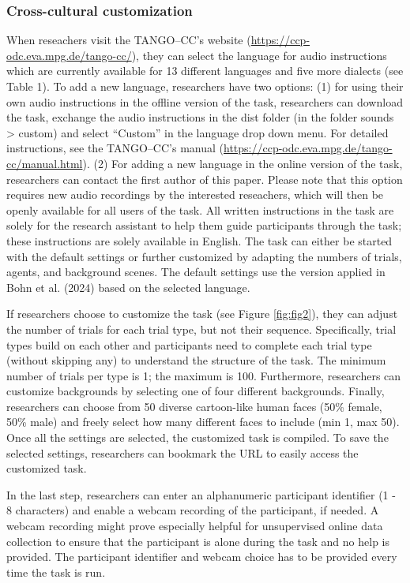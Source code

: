 \documentclass[
  man,floatsintext]{apa7}
\begin{document}
\subsubsection{Cross-cultural customization}\label{cross-cultural-customization}

When reseachers visit the TANGO--CC's website
(\url{https://ccp-odc.eva.mpg.de/tango-cc/}), they can select the language for audio instructions which are currently available for 13 different languages and five more dialects (see Table 1). To add a new language, researchers have two options:
(1) for using their own audio instructions in the offline version of the task, researchers can download the task, exchange the audio instructions in the dist folder (in the folder sounds \textgreater{} custom) and select ``Custom'' in the language drop down menu.
For detailed instructions, see the TANGO--CC's manual (\url{https://ccp-odc.eva.mpg.de/tango-cc/manual.html}).
(2) For adding a new language in the online version of the task, researchers can contact the first author of this paper. Please note that this option requires new audio recordings by the interested reseachers, which will then be openly available for all users of the task.
All written instructions in the task are solely for the research assistant to help them guide participants through the task; these instructions are solely available in English.
The task can either be started with the default settings or further customized by adapting the numbers of trials, agents, and background scenes.
The default settings use the version applied in Bohn et al. (2024) based on the selected language.

If researchers choose to customize the task (see Figure \ref{fig:fig2}), they can adjust the number of trials for each trial type, but not their sequence.
Specifically, trial types build on each other and participants need to complete each trial type (without skipping any) to understand the structure of the task.
The minimum number of trials per type is 1; the maximum is 100.
Furthermore, researchers can customize backgrounds by selecting one of four different backgrounds.
Finally, researchers can choose from 50 diverse cartoon-like human faces (50\% female, 50\% male) and freely select how many different faces to include (min 1, max 50).
Once all the settings are selected, the customized task is compiled.
To save the selected settings, researchers can bookmark the URL to easily access the customized task.

In the last step, researchers can enter an alphanumeric participant identifier (1 - 8 characters) and enable a webcam recording of the participant, if needed. A webcam recording might prove especially helpful for unsupervised online data collection to ensure that the participant is alone during the task and no help is provided.
The participant identifier and webcam choice has to be provided every time the task is run.
\end{document}

